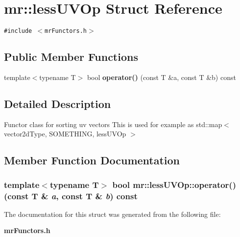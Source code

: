 \section{mr::less\-UVOp Struct Reference}
\label{structmr_1_1lessUVOp}
{\tt \#include $<$mr\-Functors.h$>$}

\subsection*{Public Member Functions}
\begin{CompactItemize}
\item 
template$<$typename T$>$ bool {\bf operator()} (const T \&a, const T \&b) const 
\end{CompactItemize}


\subsection{Detailed Description}
Functor class for sorting uv vectors This is used for example as std::map$<$ vector2d\-Type, SOMETHING, less\-UVOp $>$ 



\subsection{Member Function Documentation}
\subsubsection{\setlength{\rightskip}{0pt plus 5cm}template$<$typename T$>$ bool mr::less\-UVOp::operator() (const T \& {\em a}, const T \& {\em b}) const\hspace{0.3cm}{\tt  [inline]}}\label{structmr_1_1lessUVOp_a0}




The documentation for this struct was generated from the following file:\begin{CompactItemize}
\item 
{\bf mr\-Functors.h}\end{CompactItemize}

